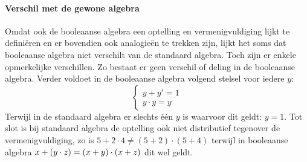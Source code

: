 \paragraph{Verschil met de gewone algebra}
Omdat ook de booleaanse algebra een optelling en vermenigvuldiging lijkt te defini\"eren en er bovendien ook analogie\"en te trekken zijn, lijkt het soms dat booleaanse algebra niet verschilt van de standaard algebra. Toch zijn er enkele opmerkelijke verschillen. Zo bestaat er geen verschil of deling in de booleaanse algebra. Verder voldoet in de booleaanse algebra volgend stelsel voor iedere $y$:
\begin{equation}
\left\{\begin{array}{l}
y+y'=1\\
y\cdot y=y
\end{array}\right.
\end{equation}%
Terwijl in de standaard algebra er slechts \'e\'en $y$ is waarvoor dit geldt: $y=1$. Tot slot is bij standaard algebra de optelling ook niet distributief tegenover de vermenigvuldiging, zo is $5+2\cdot4\neq(5+2)\cdot(5+4)$ terwijl in booleaanse algebra $x+\left( y\cdot z \right)=\left( x+y \right)\cdot\left( x+z \right)$ dit wel geldt.

